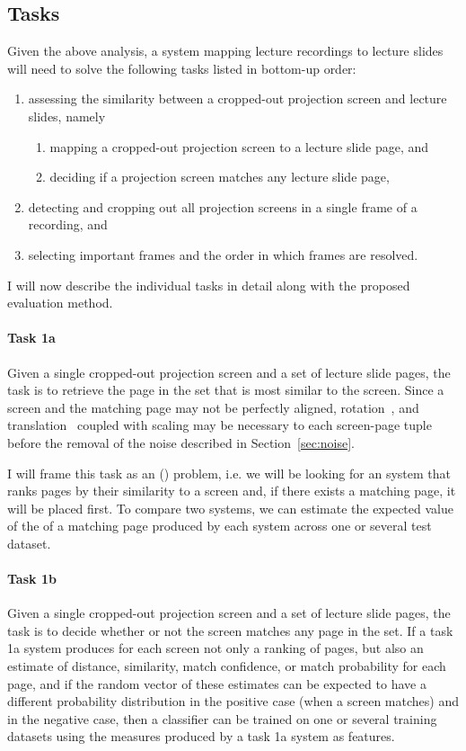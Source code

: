 \subsection{Tasks}
\label{sec:tasks}
Given the above analysis, a system mapping lecture recordings to lecture slides
will need to solve the following tasks listed in bottom-up order:
\begin{enumerate}
  \item assessing the similarity between a cropped-out projection screen and
    lecture slides, namely
    \begin{enumerate}
      \item mapping a cropped-out projection screen to a lecture slide page, and
      \item deciding if a projection screen matches any lecture slide page,
    \end{enumerate}
  \item detecting and cropping out all projection screens in a single frame
    of a recording, and
  \item selecting important frames and the order in which frames are resolved.
\end{enumerate}
I will now describe the individual tasks in detail along with the proposed
evaluation method.

\paragraph{Task 1a} Given a single cropped-out projection screen and a set of
lecture slide pages, the task is to retrieve the page in the set that is most
similar to the screen. Since a screen and the matching page may not be
perfectly aligned, rotation~\cite{smith1995simple}, and
translation~\cite{sarvaiyaetal09} coupled with scaling may be necessary to
 each screen-page tuple before the removal of the noise
described in Section~\ref{sec:noise}.

I will frame this task as an  () problem,
i.e. we will be looking for an  system that ranks pages by their
similarity to a screen and, if there exists a matching page, it will be placed
first. To compare two systems, we can estimate the expected value of the
 of a matching page produced by each system across one or several
test dataset.

\paragraph{Task 1b} Given a single cropped-out projection screen and a set of
lecture slide pages, the task is to decide whether or not the screen matches
any page in the set.  If a task 1a system produces for each screen not only a
ranking of pages, but also an estimate of distance, similarity, match
confidence, or match probability for each page, and if the random vector of
these estimates can be expected to have a different probability distribution
in the positive case (when a screen matches) and in the negative case, then a
classifier can be trained on one or several training datasets using the
measures produced by a task 1a system as features.

